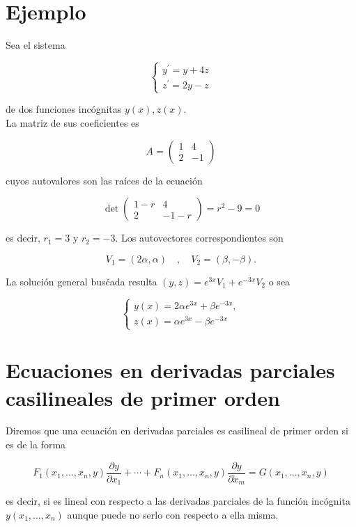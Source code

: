 \documentclass[10pt]{article}
\theoremstyle{plain}
\theoremstyle{definition}
\theoremstyle{remark}
\begin{document}
\section*{Ejemplo}
Sea el sistema

$$
\left\{\begin{array}{l}
y^{\prime}=y+4 z \\
z^{\prime}=2 y-z
\end{array}\right.
$$

de dos funciones incógnitas $y(x), z(x)$.\\
La matriz de sus coeficientes es

$$
A=\left(\begin{array}{cc}
1 & 4 \\
2 & -1
\end{array}\right)
$$

cuyos autovalores son las raíces de la ecuación

$$
\operatorname{det}\left(\begin{array}{cc}
1-r & 4 \\
2 & -1-r
\end{array}\right)=r^{2}-9=0
$$

es decir, $r_{1}=3$ y $r_{2}=-3$. Los autovectores correspondientes son

$$
V_{1}=(2 \alpha, \alpha) \quad, \quad V_{2}=(\beta,-\beta) .
$$

La solución general busčada resulta $(y, z)=e^{3 x} V_{1}+e^{-3 x} V_{2}$ o sea

$$
\left\{\begin{array}{l}
y(x)=2 \alpha e^{3 x}+\beta e^{-3 x}, \\
z(x)=\alpha e^{3 x}-\beta e^{-3 x}
\end{array}\right.
$$

\section{Ecuaciones en derivadas parciales casilineales de primer orden}
Diremos que una ecuación en derivadas parciales es casilineal de primer orden si es de la forma


\begin{equation*}
F_{1}\left(x_{1}, \ldots, x_{n}, y\right) \frac{\partial y}{\partial x_{1}}+\cdots+F_{n}\left(x_{1}, \ldots, x_{n}, y\right) \frac{\partial y}{\partial \dot{x}_{m}}=G\left(x_{1}, \ldots, x_{n}, y\right) \tag{14-1}
\end{equation*}


es decir, si es lineal con respecto a las derivadas parciales de la función incógnita $y\left(x_{1}, \ldots, x_{n}\right)$ aunque puede no serlo con respecto a ella misma.
\end{document}
